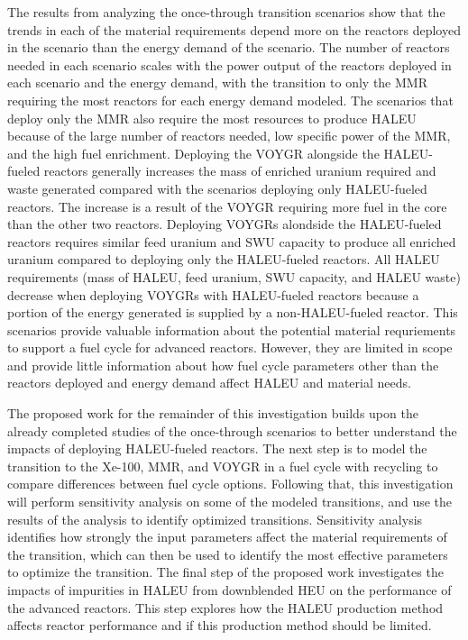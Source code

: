 The results from analyzing the once-through transition scenarios show 
that the trends in each of the material requirements depend more on the 
reactors deployed in the scenario than the energy 
demand of the scenario. The number of reactors needed in each scenario 
scales with the power output of the reactors deployed in each scenario 
and the energy demand, 
with the transition to only the \gls{MMR} requiring the most reactors for 
each energy demand modeled. The scenarios that deploy only the \gls{MMR} 
also require the most resources to produce \gls{HALEU}
because of the large number of reactors needed, low specific power of the 
\gls{MMR}, and the high fuel enrichment. Deploying the VOYGR 
alongside the \gls{HALEU}-fueled reactors generally increases the 
mass of enriched uranium required and waste generated compared with the 
scenarios deploying 
only \gls{HALEU}-fueled reactors. The increase is a result of the 
VOYGR requiring more fuel in the core than the other two reactors. 
Deploying VOYGRs alondside the \gls{HALEU}-fueled reactors requires similar 
feed uranium and \gls{SWU} capacity to produce all enriched uranium compared 
to deploying only the \gls{HALEU}-fueled 
reactors. All \gls{HALEU} requirements
(mass of \gls{HALEU}, feed uranium, \gls{SWU} capacity, and \gls{HALEU} 
waste) decrease when deploying VOYGRs with \gls{HALEU}-fueled reactors 
because a portion of the energy generated is supplied by a 
non-\gls{HALEU}-fueled reactor. This scenarios provide valuable information 
about the potential material requriements to support a fuel cycle for 
advanced reactors. However, they are limited in scope and provide little 
information about how fuel cycle parameters other than the reactors 
deployed and energy demand affect \gls{HALEU} and material needs. 

The proposed work for the remainder of this investigation builds upon 
the already completed studies of the once-through scenarios to 
better understand the impacts of deploying 
\gls{HALEU}-fueled reactors. The next step is to model the transition to 
the Xe-100, \gls{MMR}, and VOYGR in a fuel cycle with recycling to compare 
differences between fuel cycle options. Following that, this investigation 
will perform sensitivity 
analysis on some of the modeled transitions, and use the results of 
the analysis to identify optimized transitions. Sensitivity analysis 
identifies how strongly the input parameters affect 
the material requirements of the transition, which can then be used to 
identify the most effective parameters to optimize the transition. The final step of the 
proposed work investigates the impacts of impurities in 
\gls{HALEU} from downblended \gls{HEU} on the performance of the 
advanced reactors. This step explores how the \gls{HALEU} production 
method affects reactor performance and if this production method 
should be limited. 